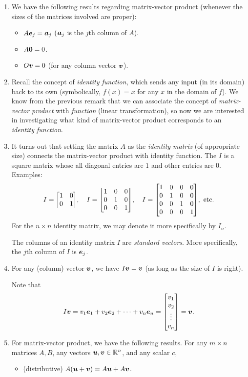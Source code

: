 \begin{enumerate}
\item We have the following results regarding matrix-vector product (whenever
the sizes of the matrices involved are proper):
\begin{itemize}
\item \(A\vb*{e}_{j}=\vb*{a}_{j}\) (\(\vb*{a}_{j}\) is the \(j\)th column of \(A\)).
\item \(A\vb*{0}=0\).
\item \(O\vb*{v}=0\) (for any column vector \(\vb*{v}\)).
\end{itemize}

\item Recall the concept of \emph{identity function}, which sends any input (in
its domain) back to its own (symbolically, \(f(x)=x\) for any \(x\) in the
domain of \(f\)). We know from the previous remark that we can associate the
concept of \emph{matrix-vector product} with \emph{function} (linear
transformation), so now we are interested in investigating what kind of
matrix-vector product corresponds to an \emph{identity function}.

\item It turns out that setting the matrix \(A\) as the \emph{identity matrix}
(of appropriate size) connects the matrix-vector product with identity
function. The  \(I\) is a square matrix whose all diagonal
entries are \(1\) and other entries are \(0\). Examples:
\[
I=\mqty[\dmat[0]{1,1}],\quad
I=\mqty[\dmat[0]{1,1,1}],\quad
I=\mqty[\dmat[0]{1,1,1,1}],\text{ etc.}
\]
For the \(n\times n\) identity matrix, we may denote it more specifically by
\(I_{n}\).

\begin{note}
The columns of an identity matrix \(I\) are \emph{standard vectors}. More
specifically, the \(j\)th column of \(I\) is \(\vb*{e}_{j}\).
\end{note}
\item \label{it:identity-matrix-vec-mult}
For any (column) vector \(\vb*{v}\), we have \(I\vb*{v}=\vb*{v}\) (as
long as the size of \(I\) is right).

\begin{pf}
Note that
\[
I\vect{v}=v_{1}\vect{e}_{1}+v_2\vect{e}_{2}+\dotsb+v_{n}\vect{e}_{n}
=\mqty[v_1\\v_2\\\vdots\\v_n]=\vect{v}.
\]
\end{pf}
\item \label{it:matrix-vec-dist-asso}
For matrix-vector product, we have the following results.  For any
\(m\times n\) matrices \(A,B\), any vectors \(\vb*{u},\vb*{v}\in\mathbb{R}^n\), and
any scalar \(c\),
\begin{itemize}
\item (distributive) \(A(\vb*{u}+\vb*{v})=A\vb*{u}+A\vb*{v}\).


\end{itemize}
\end{enumerate}
